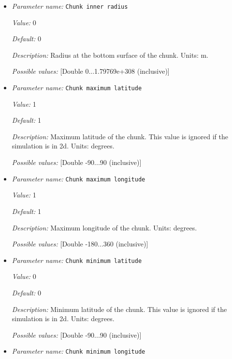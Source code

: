 \begin{itemize}
\item {\it Parameter name:} {\tt Chunk inner radius}
\label{parameters:Geometry model/Chunk/Chunk inner radius}


{\it Value:} 0


{\it Default:} 0


{\it Description:} Radius at the bottom surface of the chunk. Units: m.


{\it Possible values:} [Double 0...1.79769e+308 (inclusive)]
\item {\it Parameter name:} {\tt Chunk maximum latitude}
\label{parameters:Geometry model/Chunk/Chunk maximum latitude}


{\it Value:} 1


{\it Default:} 1


{\it Description:} Maximum latitude of the chunk. This value is ignored if the simulation is in 2d. Units: degrees.


{\it Possible values:} [Double -90...90 (inclusive)]
\item {\it Parameter name:} {\tt Chunk maximum longitude}
\label{parameters:Geometry model/Chunk/Chunk maximum longitude}


{\it Value:} 1


{\it Default:} 1


{\it Description:} Maximum longitude of the chunk. Units: degrees.


{\it Possible values:} [Double -180...360 (inclusive)]
\item {\it Parameter name:} {\tt Chunk minimum latitude}
\label{parameters:Geometry model/Chunk/Chunk minimum latitude}


{\it Value:} 0


{\it Default:} 0


{\it Description:} Minimum latitude of the chunk. This value is ignored if the simulation is in 2d. Units: degrees.


{\it Possible values:} [Double -90...90 (inclusive)]
\item {\it Parameter name:} {\tt Chunk minimum longitude}
\label{parameters:Geometry model/Chunk/Chunk minimum longitude}



\end{itemize}
